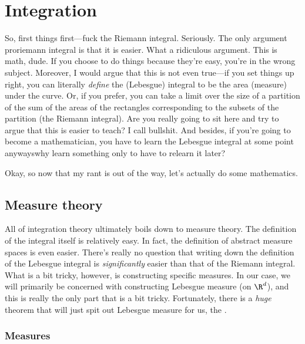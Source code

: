 \chapter{Integration}\label{chp5xx}

So, first things first---fuck the Riemann integral.  Seriously.  The only argument proriemann integral is that it is easier.  What a ridiculous argument.  This is math, dude.  If you choose to do things because they're easy, you're in the wrong subject.  Moreover, I would argue that this is not even true---if you set things up right, you can literally \emph{define} the (Lebesgue) integral to be the area (measure) under the curve.  Or, if you prefer, you can take a limit over the size of a partition of the sum of the areas of the rectangles corresponding to the subsets of the partition (the Riemann integral).  Are you really going to sit here and try to argue that this is easier to teach?  I call bullshit.  And besides, if you're going to become a mathematician, you have to learn the Lebesgue integral at some point anyways\textellipsis why learn something only to have to relearn it later?

Okay, so now that my rant is out of the way, let's actually do some mathematics.

\section{Measure theory}

All of integration theory ultimately boils down to measure theory.  The definition of the integral itself is relatively easy.  In fact, the definition of abstract measure spaces is even easier.  There's really no question that writing down the definition of the Lebesgue integral is \emph{significantly} easier than that of the Riemann integral.  What is a bit tricky, however, is constructing specific measures.  In our case, we will primarily be concerned with constructing Lebesgue measure (on $\R ^d$), and this is really the only part that is a bit tricky.  Fortunately, there is a \emph{huge} theorem that will just spit out Lebesgue measure for us, the \emph{}.

\subsection{Measures}

